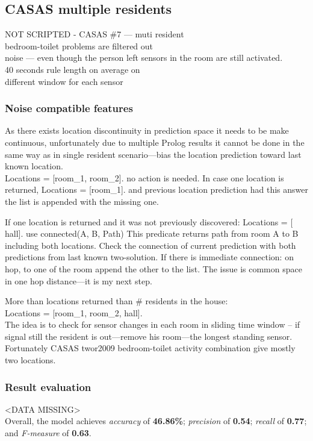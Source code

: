 \documentclass[10pt, a4paper, pdflatex, leqno, twoside, openright]{report}
\begin{document}
    \subsection{CASAS multiple residents}
NOT SCRIPTED - CASAS \#7 --- muti resident\\
bedroom-toilet problems are filtered out\\
noise --- even though the person left sensors in the room are still activated.\\
40 seconds rule length on average on\\
different window for each sensor\\

      \subsubsection{Noise compatible features}
As there exists location discontinuity in prediction space it needs to be make continuous, unfortunately due to multiple Prolog results it cannot be done in the same way as in single resident scenario—bias the location prediction toward last known location.\\

Locations = [room\_1, room\_2].
no action is needed. In case one location is returned,
Locations = [room\_1].
and previous location prediction had this answer the list is appended with the missing one.

If one location is returned and it was not previously discovered:
Locations = [ hall].
use
connected(A, B, Path)
This predicate returns path from room A to B including both locations. Check the connection of current prediction with both predictions from last known two-solution. If there is immediate connection: on hop, to one of the room append the other to the list. The issue is common space in one hop distance---it is my next step.

More than locations returned than \# residents in the house:\\
Locations = [room\_1, room\_2, hall].\\
The idea is to check for sensor changes in each room in sliding time window -- if signal still the resident is out---remove his room---the longest standing sensor.\\
Fortunately CASAS twor2009 bedroom-toilet activity combination give mostly two locations.

      \subsubsection{Result evaluation}
<DATA MISSING>\\
Overall, the model achieves \emph{accuracy} of \textbf{46.86\%}; \emph{precision} of \textbf{0.54}; \emph{recall} of \textbf{0.77}; and \emph{F-measure} of \textbf{0.63}.\\
\end{document}
